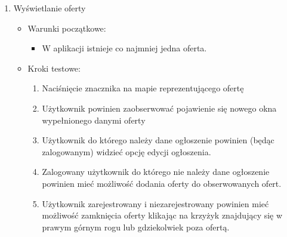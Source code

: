 \begin{enumerate}
 \item Wyświetlanie oferty
  \begin{itemize}
   \item Warunki początkowe:
    \begin{itemize}
     \item W aplikacji istnieje co najmniej jedna oferta.
    \end{itemize}
   \item Kroki testowe:
    \begin{enumerate}
     \item Naciśnięcie znacznika na mapie reprezentującego ofertę
     \item Użytkownik powinien zaobserwować pojawienie się nowego okna wypełnionego danymi oferty
     \item Użytkownik do którego należy dane ogłoszenie powinien (będąc zalogowanym) widzieć opcję edycji ogłoszenia.
     \item Zalogowany użytkownik do którego nie należy dane ogłoszenie powinien mieć możliwość dodania oferty do obserwowanych ofert.
     \item Użytkownik zarejestrowany i niezarejestrowany powinien mieć możliwość zamknięcia oferty klikając na krzyżyk znajdujący się w prawym górnym rogu lub gdziekolwiek poza ofertą.
    \end{enumerate}
  \end{itemize} 


\end{enumerate}

